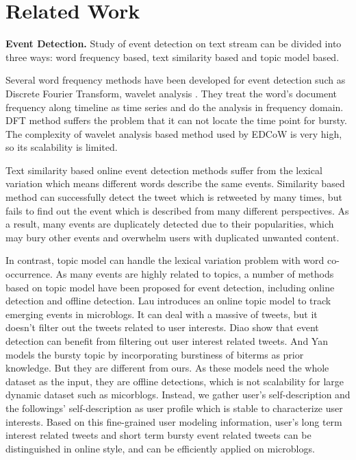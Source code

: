 \documentclass[runningheads,a4paper]{llncs}
\begin{document}

\section{Related Work}
\textbf{Event Detection.} Study of event detection on text stream can be divided into three ways: word frequency based, text similarity based and topic model based.

Several word frequency methods have been developed for event detection such as Discrete Fourier Transform\cite{he2007analyzingDFT}, wavelet analysis \cite{weng2011eventWavelet}.
They treat the word's document frequency along timeline as time series and do the analysis in frequency domain. 
DFT method suffers the problem that it can not locate the time point for bursty.
The complexity of wavelet analysis based method used by EDCoW\cite{weng2011eventWavelet} is very high, so its scalability is limited. 

 Text similarity based online event detection methods\cite{petrovic2010streaming}\cite{mccreadiescalable}  suffer from the lexical variation which means different words describe the same events.
 Similarity based method can successfully detect the tweet which is retweeted by many times, but fails to find out the event which is described from many different perspectives.
 As a result, many events are duplicately detected due to their popularities, which may bury other events and overwhelm users with duplicated unwanted content.


In contrast, topic model can handle the lexical variation problem with word co-occurrence\cite{blei2003latent}.
As many events are highly related to topics, a number of methods based on topic model have been proposed for event detection, including online detection and offline detection.
Lau\cite{lau2012line} introduces an online topic model to track emerging events in microblogs.
It can deal with a massive of tweets, but it doesn't filter out the tweets related to user interests.
Diao\cite{timeUserLDA2012finding}\cite{diao2013unified} show that event detection can benefit from filtering out user interest related tweets. 
And Yan\cite{Yan:2015wm} models the bursty topic by incorporating burstiness of biterms as prior knowledge.
But they are different from ours.
As these models need the whole dataset as the input, they are offline detections, which is not scalability for large dynamic dataset such as micorblogs.
Instead, we gather user's self-description and the followings' self-description as user profile which is stable to characterize user interests. 
Based on this fine-grained user modeling information, user's long term interest related tweets and short term bursty event related tweets can be distinguished in online style, and can be efficiently applied on microblogs.
\end{document}
